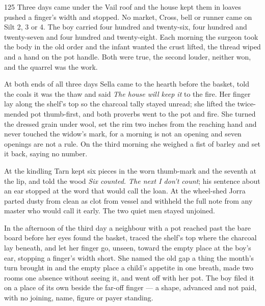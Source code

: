 
\scenebreak


\scenebreak


\scenebreak

\CRtailpiece
\begin{CRchronicle}{125}
Three days came under the Vail roof and the house kept them in loaves pushed a finger’s width and stopped. No market, Cross, bell or runner came on Silt 2, 3 or 4. The boy carried four hundred and twenty-six, four hundred and twenty-seven and four hundred and twenty-eight. Each morning the surgeon took the body in the old order and the infant wanted the crust lifted, the thread wiped and a hand on the pot handle. Both were true, the second louder, neither won, and the quarrel was the work.

At both ends of all three days Sella came to the hearth before the basket, told the coals it was the thaw and said \emph{The house will keep it} to the fire. Her finger lay along the shelf’s top so the charcoal tally stayed unread; she lifted the twice-mended pot thumb-first, and both proverbs went to the pot and fire. She turned the dressed grain under wool, set the rim two inches from the reaching hand and never touched the widow’s mark, for a morning is not an opening and seven openings are not a rule. On the third morning she weighed a fist of barley and set it back, saying no number.

At the kindling Tarn kept six pieces in the worn thumb-mark and the seventh at the lip, and told the wood \emph{Six counted. The next I don’t count}; his sentence about an ear stopped at the word that would call the loan. At the wheel-shed Jorra parted dusty from clean as clot from vessel and withheld the full note from any master who would call it early. The two quiet men stayed unjoined.

In the afternoon of the third day a neighbour with a pot reached past the bare board before her eyes found the basket, traced the shelf’s top where the charcoal lay beneath, and let her finger go, unseen, toward the empty place at the boy’s ear, stopping a finger’s width short. She named the old gap a thing the month’s turn brought in and the empty place a child’s appetite in one breath, made two rooms one absence without seeing it, and went off with her pot. The boy filed it on a place of its own beside the far-off finger — a shape, advanced and not paid, with no joining, name, figure or payer standing.


\end{CRchronicle}
